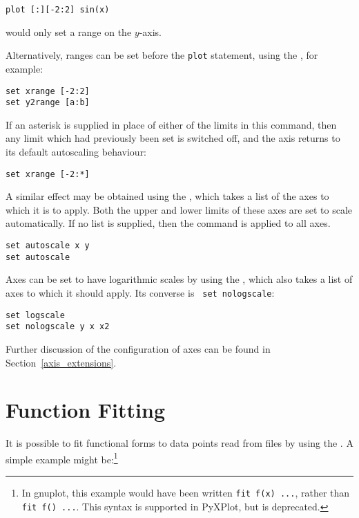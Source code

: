 \begin{verbatim}
plot [:][-2:2] sin(x)
\end{verbatim}

\noindent would only set a range on the $y$-axis.

Alternatively, ranges can be set before the {\tt plot} statement, using the
, for example:

\begin{verbatim}
set xrange [-2:2]
set y2range [a:b]
\end{verbatim}

If an asterisk is supplied in place of either of the limits in this command, then
any limit which had previously been set is switched off, and the axis returns to
its default autoscaling behaviour:

\begin{verbatim}
set xrange [-2:*]
\end{verbatim}

\noindent A similar effect may be obtained using the ,
which takes a list of the axes to which it is to apply. Both the upper and
lower limits of these axes are set to scale automatically. If no list is
supplied, then the command is applied to all axes.

\begin{verbatim}
set autoscale x y
set autoscale
\end{verbatim}

Axes can be set to have logarithmic scales by using the ,
which also takes a list of axes to which it should apply. Its converse is {\tt
set nologscale}:

\begin{verbatim}
set logscale
set nologscale y x x2
\end{verbatim}

Further discussion of the configuration of axes can be found in
Section~\ref{axis_extensions}.

\section{Function Fitting}
\label{fit_command}

It is possible to fit functional forms to data points read from files by using
the . A simple example might be:\footnote{In gnuplot, this example
would have been written {\tt fit f(x) ...}, rather than {\tt fit f() ...}. This
syntax is supported in PyXPlot, but is deprecated.}

